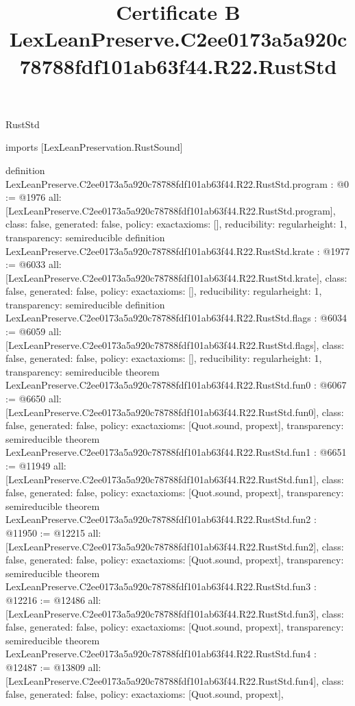 \begin{lexlean}{RustStd}
\title{Certificate B LexLeanPreserve.C2ee0173a5a920c78788fdf101ab63f44.R22.RustStd}
\begin{coremodule}
imports [LexLeanPreservation.RustSound]

definition LexLeanPreserve.C2ee0173a5a920c78788fdf101ab63f44.R22.RustStd.program : @0 := @1976 {
  all: [LexLeanPreserve.C2ee0173a5a920c78788fdf101ab63f44.R22.RustStd.program],
  class: false,
  generated: false,
  policy: exact{axioms: []},
  reducibility: regular{height: 1},
  transparency: semireducible
}
definition LexLeanPreserve.C2ee0173a5a920c78788fdf101ab63f44.R22.RustStd.krate : @1977 := @6033 {
  all: [LexLeanPreserve.C2ee0173a5a920c78788fdf101ab63f44.R22.RustStd.krate],
  class: false,
  generated: false,
  policy: exact{axioms: []},
  reducibility: regular{height: 1},
  transparency: semireducible
}
definition LexLeanPreserve.C2ee0173a5a920c78788fdf101ab63f44.R22.RustStd.flags : @6034 := @6059 {
  all: [LexLeanPreserve.C2ee0173a5a920c78788fdf101ab63f44.R22.RustStd.flags],
  class: false,
  generated: false,
  policy: exact{axioms: []},
  reducibility: regular{height: 1},
  transparency: semireducible
}
theorem LexLeanPreserve.C2ee0173a5a920c78788fdf101ab63f44.R22.RustStd.fun0 : @6067 := @6650 {
  all: [LexLeanPreserve.C2ee0173a5a920c78788fdf101ab63f44.R22.RustStd.fun0],
  class: false,
  generated: false,
  policy: exact{axioms: [Quot.sound, propext]},
  transparency: semireducible
}
theorem LexLeanPreserve.C2ee0173a5a920c78788fdf101ab63f44.R22.RustStd.fun1 : @6651 := @11949 {
  all: [LexLeanPreserve.C2ee0173a5a920c78788fdf101ab63f44.R22.RustStd.fun1],
  class: false,
  generated: false,
  policy: exact{axioms: [Quot.sound, propext]},
  transparency: semireducible
}
theorem LexLeanPreserve.C2ee0173a5a920c78788fdf101ab63f44.R22.RustStd.fun2 : @11950 := @12215 {
  all: [LexLeanPreserve.C2ee0173a5a920c78788fdf101ab63f44.R22.RustStd.fun2],
  class: false,
  generated: false,
  policy: exact{axioms: [Quot.sound, propext]},
  transparency: semireducible
}
theorem LexLeanPreserve.C2ee0173a5a920c78788fdf101ab63f44.R22.RustStd.fun3 : @12216 := @12486 {
  all: [LexLeanPreserve.C2ee0173a5a920c78788fdf101ab63f44.R22.RustStd.fun3],
  class: false,
  generated: false,
  policy: exact{axioms: [Quot.sound, propext]},
  transparency: semireducible
}
theorem LexLeanPreserve.C2ee0173a5a920c78788fdf101ab63f44.R22.RustStd.fun4 : @12487 := @13809 {
  all: [LexLeanPreserve.C2ee0173a5a920c78788fdf101ab63f44.R22.RustStd.fun4],
  class: false,
  generated: false,
  policy: exact{axioms: [Quot.sound, propext]},
}
\end{coremodule}
\end{lexlean}
